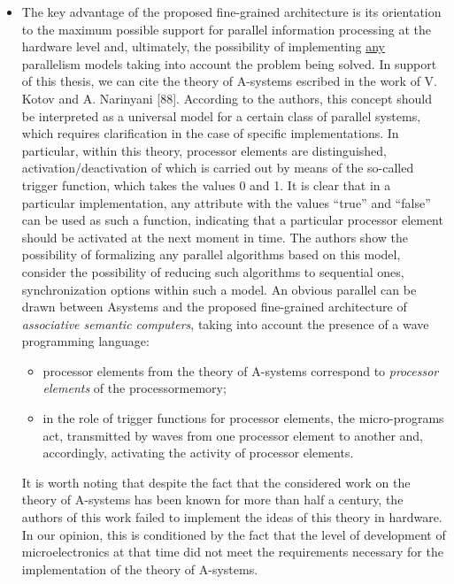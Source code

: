 \documentclass{article}
\begin{document}
\begin{multicols}{2}
\begin{itemize}
		\item The key advantage of the proposed fine-grained architecture is its orientation to the maximum possible support for parallel information processing at the hardware level and, ultimately, the possibility of implementing \uline{any} parallelism models taking into account the problem being solved. In support of this thesis, we can cite the theory of A-systems escribed in the work of V. Kotov and A. Narinyani [88]. According to the authors, this concept should be interpreted as a universal model for a certain class of parallel systems, which requires clarification in the case of specific implementations. In particular, within this theory, processor elements are distinguished, activation/deactivation of which is carried out by means of the so-called trigger function, which takes the values 0 and 1. It is clear that in a particular implementation, any attribute with the values “true” and “false” can be used as such a function, indicating that a particular processor element should be activated at the next moment in time. The authors show the possibility of formalizing any parallel algorithms based on this model, consider the possibility of reducing such algorithms to sequential ones, synchronization options within such a model. An obvious parallel can be drawn between Asystems and the proposed fine-grained architecture of \textit{associative semantic computers}, taking into account the presence of a wave programming language:
		
		\begin{itemize}
			\item processor elements from the theory of A-systems correspond to \textit{processor elements} of the processormemory;
			
			\item in the role of trigger functions for processor elements, the micro-programs act, transmitted by waves from one processor element to another and, accordingly, activating the activity of processor elements.
		\end{itemize} 
	
		It is worth noting that despite the fact that the considered work on the theory of A-systems has been known for more than half a century, the authors of this work failed to implement the ideas of this theory in hardware. In our opinion, this is conditioned by the fact that the level of development of microelectronics at that time did not meet the requirements necessary for the implementation of the theory of A-systems.
	\end{itemize}


\end{multicols}
\end{document}
